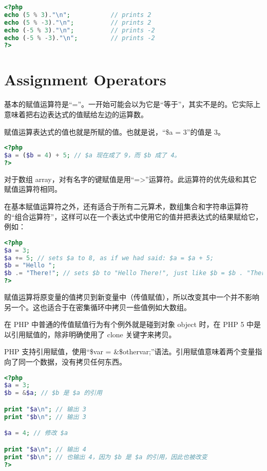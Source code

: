 \begin{lstlisting}[language=PHP]
<?php
echo (5 % 3)."\n";           // prints 2
echo (5 % -3)."\n";          // prints 2
echo (-5 % 3)."\n";          // prints -2
echo (-5 % -3)."\n";         // prints -2
?>
\end{lstlisting}



\section{Assignment Operators}

基本的赋值运算符是“=”。一开始可能会以为它是“等于”，其实不是的。它实际上意味着把右边表达式的值赋给左边的运算数。

赋值运算表达式的值也就是所赋的值。也就是说，“\$a = 3”的值是 3。



\begin{lstlisting}[language=PHP]
<?php
$a = ($b = 4) + 5; // $a 现在成了 9，而 $b 成了 4。
?>
\end{lstlisting}

对于数组 array，对有名字的键赋值是用“=>”运算符。此运算符的优先级和其它赋值运算符相同。

在基本赋值运算符之外，还有适合于所有二元算术，数组集合和字符串运算符的“组合运算符”，这样可以在一个表达式中使用它的值并把表达式的结果赋给它，例如：

\begin{lstlisting}[language=PHP]
<?php
$a = 3;
$a += 5; // sets $a to 8, as if we had said: $a = $a + 5;
$b = "Hello ";
$b .= "There!"; // sets $b to "Hello There!", just like $b = $b . "There!";
?>
\end{lstlisting}

赋值运算将原变量的值拷贝到新变量中（传值赋值），所以改变其中一个并不影响另一个。这也适合于在密集循环中拷贝一些值例如大数组。

在 PHP 中普通的传值赋值行为有个例外就是碰到对象 object 时，在 PHP 5 中是以引用赋值的，除非明确使用了 clone 关键字来拷贝。

PHP 支持引用赋值，使用“\$var = \&\$othervar;”语法。引用赋值意味着两个变量指向了同一个数据，没有拷贝任何东西。

\begin{lstlisting}[language=PHP]
<?php
$a = 3;
$b = &$a; // $b 是 $a 的引用

print "$a\n"; // 输出 3
print "$b\n"; // 输出 3

$a = 4; // 修改 $a

print "$a\n"; // 输出 4
print "$b\n"; // 也输出 4，因为 $b 是 $a 的引用，因此也被改变
?>
\end{lstlisting}

